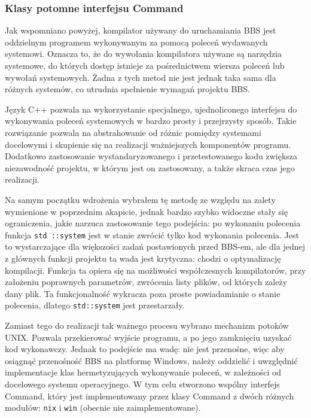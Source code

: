\subsubsection{Klasy potomne interfejsu Command}

Jak wspomniano powyżej, kompilator używany do uruchamiania BBS jest oddzielnym programem wykonywanym za pomocą poleceń wydawanych systemowi. Oznacza to, że do wywołania kompilatora używane są narzędzia systemowe, do których dostęp istnieje za pośrednictwem wiersza poleceń lub wywołań systemowych. Żadna z tych metod nie jest jednak taka sama dla różnych systemów, co utrudnia spełnienie wymagań projektu BBS.

Język C++ pozwala na wykorzystanie specjalnego, ujednoliconego interfejsu do wykonywania poleceń systemowych w bardzo prosty i przejrzysty sposób. Takie rozwiązanie pozwala na abstrahowanie od różnic pomiędzy systemami docelowymi i skupienie się na realizacji ważniejszych komponentów programu. Dodatkowo zastosowanie wystandaryzowanego i przetestowanego kodu zwiększa niezawodność projektu, w którym jest on zastosowany, a także skraca czas jego realizacji.

Na samym początku wdrożenia wybrałem tę metodę ze względu na zalety wymienione w poprzednim akapicie, jednak bardzo szybko widoczne stały się ograniczenia, jakie narzuca zastosowanie tego podejścia: po wykonaniu polecenia funkcja \texttt{std ::system} jest w stanie zwrócić tylko kod wykonania polecenia. Jest to wystarczające dla większości zadań postawionych przed BBS-em, ale dla jednej z głównych funkcji projektu ta wada jest krytyczna: chodzi o optymalizację kompilacji. Funkcja ta opiera się na możliwości współczesnych kompilatorów, przy założeniu poprawnych parametrów, zwrócenia listy plików, od których zależy dany plik. Ta funkcjonalność wykracza poza proste powiadamianie o stanie polecenia, dlatego \texttt{std::system} jest przestarzały.

Zamiast tego do realizacji tak ważnego procesu wybrano mechanizm potoków UNIX. Pozwala przekierować wyjście programu, a po jego zamknięciu uzyskać kod wykonawczy. Jednak to podejście ma wadę: nie jest przenośne, więc aby osiągnąć przenośność BBS na platformę Windows, należy oddzielić i uwzględnić implementacje klas hermetyzujących wykonywanie poleceń, w zależności od docelowego systemu operacyjnego. W tym celu stworzono wspólny interfejs Command, który jest implementowany przez klasy Command z dwóch różnych modułów: \texttt{nix} i \texttt{win} (obecnie nie zaimplementowane).

